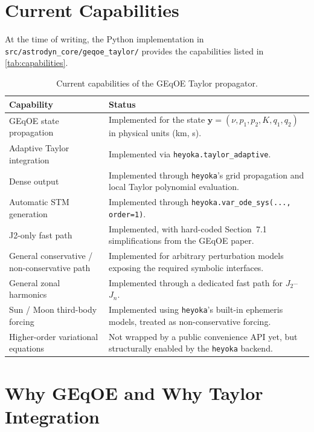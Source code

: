 \documentclass[11pt]{article}
\begin{document}
\section{Current Capabilities}

At the time of writing, the Python implementation in
\texttt{src/astrodyn\_core/geqoe\_taylor/} provides the capabilities listed in
\autoref{tab:capabilities}.

\begin{table}[h]
\centering
\caption{Current capabilities of the GEqOE Taylor propagator.}
\label{tab:capabilities}
\begin{tabular}{>{\raggedright\arraybackslash}p{} >{\raggedright\arraybackslash}p{}}
\toprule
Capability & Status \\
\midrule
GEqOE state propagation & Implemented for the state
$\bm{y}=(\nu,p_1,p_2,K,q_1,q_2)$ in physical units (km, s). \\
Adaptive Taylor integration & Implemented via \texttt{heyoka.taylor\_adaptive}. \\
Dense output & Implemented through \texttt{heyoka}'s grid propagation and local
Taylor polynomial evaluation. \\
Automatic STM generation & Implemented through
\texttt{heyoka.var\_ode\_sys(..., order=1)}. \\
J2-only fast path & Implemented, with hard-coded Section~7.1 simplifications
from the GEqOE paper. \\
General conservative / non-conservative path & Implemented for arbitrary
perturbation models exposing the required symbolic interfaces. \\
General zonal harmonics & Implemented through a dedicated fast path for
$J_2$--$J_n$. \\
Sun / Moon third-body forcing & Implemented using \texttt{heyoka}'s built-in
ephemeris models, treated as non-conservative forcing. \\
Higher-order variational equations & Not wrapped by a public convenience API
yet, but structurally enabled by the \texttt{heyoka} backend. \\
\bottomrule
\end{tabular}
\end{table}

\section{Why GEqOE and Why Taylor Integration}
\end{document}
